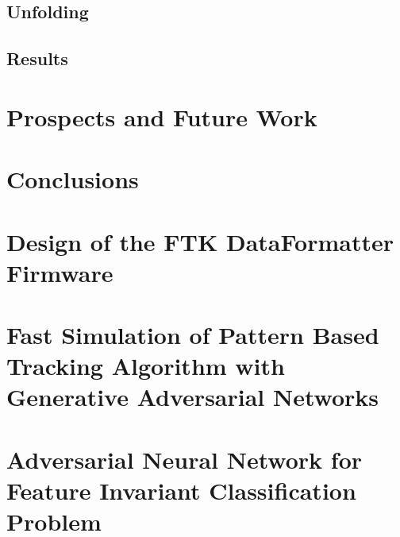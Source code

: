 \documentclass{report}
\begin{document}
\section{Unfolding}


\section{Results}


\chapter{Prospects and Future Work}
\chapter{Conclusions}

\appendix
\chapter{Design of the FTK DataFormatter Firmware}
\chapter{Fast Simulation of Pattern Based Tracking Algorithm with Generative Adversarial Networks}
\chapter{Adversarial Neural Network for Feature Invariant Classification Problem}



\end{document}
